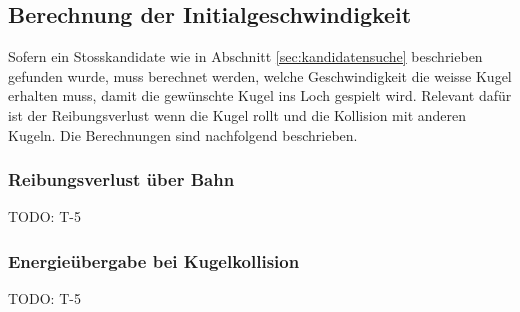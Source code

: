 \subsection{Berechnung der Initialgeschwindigkeit}\label{sec:initialgeschwindigkeit}
Sofern ein Stosskandidate wie in Abschnitt \ref{sec:kandidatensuche} beschrieben gefunden wurde, muss berechnet werden,
welche Geschwindigkeit die weisse Kugel erhalten muss, damit die gewünschte Kugel ins Loch gespielt wird.
Relevant dafür ist der Reibungsverlust wenn die Kugel rollt und die Kollision mit anderen Kugeln.
Die Berechnungen sind nachfolgend beschrieben.

\subsubsection{Reibungsverlust über Bahn}
TODO: T-5

\subsubsection{Energieübergabe bei Kugelkollision}
TODO: T-5
